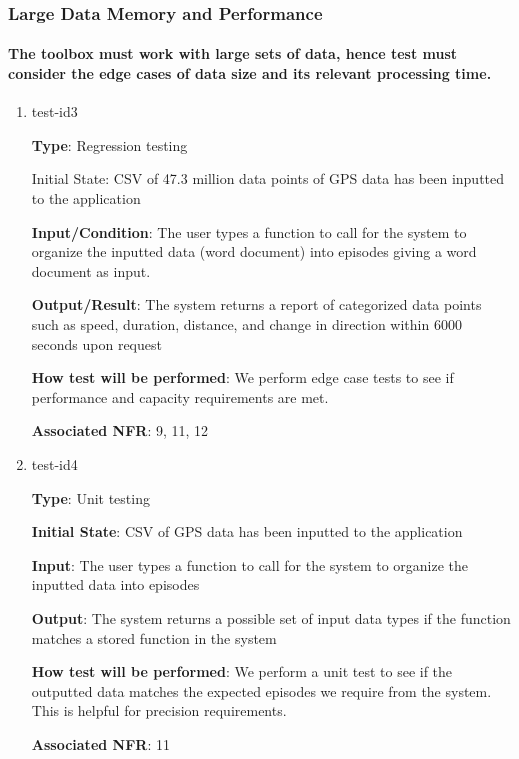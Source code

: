 \documentclass[12pt, titlepage]{article}
\begin{document}
\subsubsection{Large Data Memory and Performance}
\paragraph{The toolbox must work with large sets of data, hence test must consider the edge cases of data size and its relevant processing time. }

\begin{enumerate}

\item{test-id3\\}

\textbf{Type}: Regression testing
					
Initial State: CSV of 47.3 million data points of GPS data has been inputted to the application
					
\textbf{Input/Condition}: The user types a function to call for the system to organize the
inputted data (word document) into episodes giving a word document as input. 
					
\textbf{Output/Result}: The system returns a report of categorized data points such
as speed, duration, distance, and change in direction within 6000 seconds upon request
					
\textbf{How test will be performed}: We perform edge case tests to see if performance and capacity requirements are met. 

\textbf{Associated NFR}: 9, 11, 12

\item{test-id4\\}

\textbf{Type}: Unit testing
					
\textbf{Initial State}: CSV of GPS data has been inputted to the application
					
\textbf{Input}: The user types a function to call for the system to organize the
inputted data into episodes
					
\textbf{Output}: The system returns a possible set of input data types if the function matches a stored function in the system
					
\textbf{How test will be performed}: We perform a unit test to see if the outputted data matches the expected episodes we require from the system. This is helpful for precision requirements.

\textbf{Associated NFR}: 11

\end{enumerate}
\end{document}
